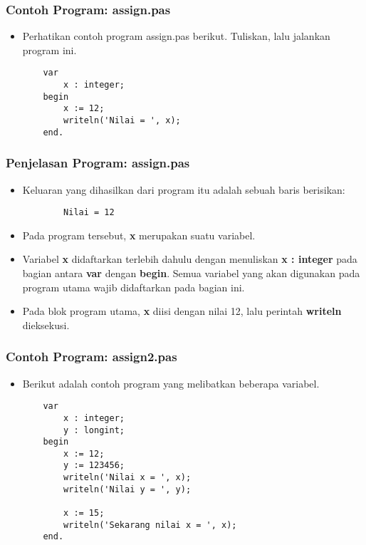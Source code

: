 \documentclass{beamer}
\begin{document}
\begin{frame}[fragile]
\frametitle{Contoh Program: assign.pas}
\begin{itemize}
    \item Perhatikan contoh program assign.pas berikut. Tuliskan, lalu jalankan program ini.
    \begin{lstlisting}
    var
        x : integer;
    begin
        x := 12;
        writeln('Nilai = ', x);
    end.
    \end{lstlisting}
\end{itemize}
\end{frame}

\begin{frame}[fragile]
\frametitle{Penjelasan Program: assign.pas}
\begin{itemize}
    \item Keluaran yang dihasilkan dari program itu adalah sebuah baris berisikan:
    \begin{lstlisting}
        Nilai = 12
    \end{lstlisting}
    \item Pada program tersebut, \textbf{x} merupakan suatu variabel.
    \item Variabel \textbf{x} didaftarkan terlebih dahulu dengan menuliskan \textbf{x : integer} pada bagian antara \textbf{var} dengan \textbf{begin}. Semua variabel yang akan digunakan pada program utama wajib didaftarkan pada bagian ini.
    \item Pada blok program utama, \textbf{x} diisi dengan nilai 12, lalu perintah \textbf{writeln} dieksekusi.
\end{itemize}
\end{frame}

\begin{frame}[fragile]
\frametitle{Contoh Program: assign2.pas}
\begin{itemize}
    \item Berikut adalah contoh program yang melibatkan beberapa variabel.
    \begin{lstlisting}
    var
        x : integer;
        y : longint;
    begin
        x := 12;
        y := 123456;
        writeln('Nilai x = ', x);
        writeln('Nilai y = ', y);

        x := 15;
        writeln('Sekarang nilai x = ', x);
    end.
    \end{lstlisting}
\end{itemize}
\end{frame}
\end{document}
